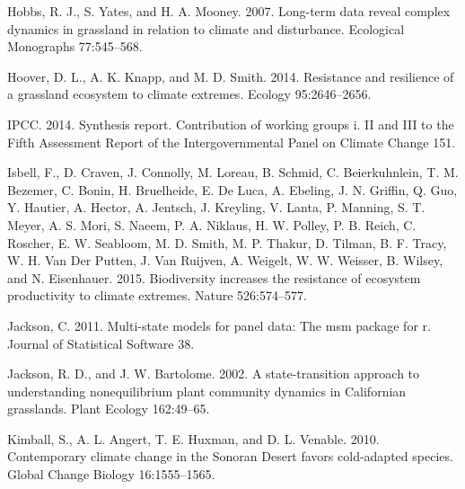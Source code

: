 \documentclass[twoside,12pt,final]{ucthesis-CA2012}
\begin{document}
\begin{ucmainmatter}
\leavevmode\hypertarget{ref-Hobbs2007}{}%
Hobbs, R. J., S. Yates, and H. A. Mooney. 2007. Long-term data reveal complex dynamics in grassland in relation to climate and disturbance. Ecological Monographs 77:545--568.

\leavevmode\hypertarget{ref-Hoover2014}{}%
Hoover, D. L., A. K. Knapp, and M. D. Smith. 2014. Resistance and resilience of a grassland ecosystem to climate extremes. Ecology 95:2646--2656.

\leavevmode\hypertarget{ref-IPCC2014}{}%
IPCC. 2014. Synthesis report. Contribution of working groups i. II and III to the Fifth Assessment Report of the Intergovernmental Panel on Climate Change 151.

\leavevmode\hypertarget{ref-Isbell2015}{}%
Isbell, F., D. Craven, J. Connolly, M. Loreau, B. Schmid, C. Beierkuhnlein, T. M. Bezemer, C. Bonin, H. Bruelheide, E. De Luca, A. Ebeling, J. N. Griffin, Q. Guo, Y. Hautier, A. Hector, A. Jentsch, J. Kreyling, V. Lanta, P. Manning, S. T. Meyer, A. S. Mori, S. Naeem, P. A. Niklaus, H. W. Polley, P. B. Reich, C. Roscher, E. W. Seabloom, M. D. Smith, M. P. Thakur, D. Tilman, B. F. Tracy, W. H. Van Der Putten, J. Van Ruijven, A. Weigelt, W. W. Weisser, B. Wilsey, and N. Eisenhauer. 2015. Biodiversity increases the resistance of ecosystem productivity to climate extremes. Nature 526:574--577.

\leavevmode\hypertarget{ref-Jackson2011}{}%
Jackson, C. 2011. Multi-state models for panel data: The msm package for r. Journal of Statistical Software 38.

\leavevmode\hypertarget{ref-Jackson2002}{}%
Jackson, R. D., and J. W. Bartolome. 2002. A state-transition approach to understanding nonequilibrium plant community dynamics in Californian grasslands. Plant Ecology 162:49--65.

\leavevmode\hypertarget{ref-Kimball2010}{}%
Kimball, S., A. L. Angert, T. E. Huxman, and D. L. Venable. 2010. Contemporary climate change in the Sonoran Desert favors cold-adapted species. Global Change Biology 16:1555--1565.


\end{ucmainmatter}
\end{document}
